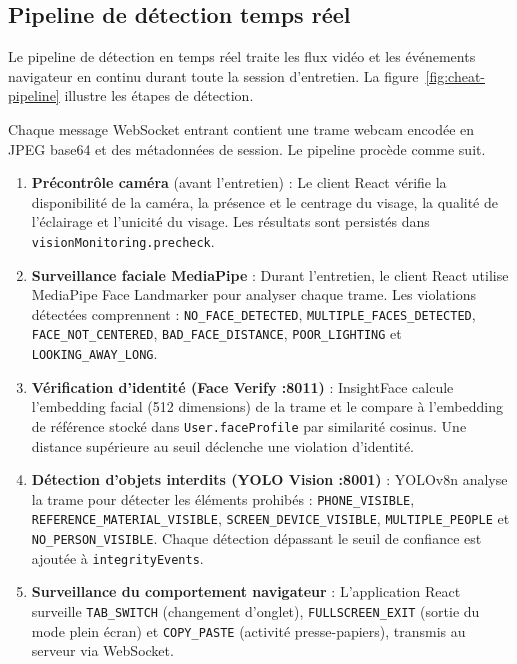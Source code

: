 \subsection{Pipeline de détection temps réel}

\begin{sloppypar}
Le pipeline de détection en temps réel traite les flux vidéo et les événements
navigateur en continu durant toute la session d'entretien.
La figure~\ref{fig:cheat-pipeline} illustre les étapes de détection.

Chaque message WebSocket entrant contient une trame webcam encodée en JPEG base64
et des métadonnées de session. Le pipeline procède comme suit.
\end{sloppypar}

\begin{enumerate}
\item \textbf{Précontrôle caméra} (avant l'entretien) : Le client React vérifie la
      disponibilité de la caméra, la présence et le centrage du visage, la qualité de
      l'éclairage et l'unicité du visage. Les résultats sont persistés dans
      \texttt{visionMonitoring.precheck}.

\item \textbf{Surveillance faciale MediaPipe} : Durant l'entretien, le client React
      utilise MediaPipe Face Landmarker pour analyser chaque trame. Les violations
      détectées comprennent : \texttt{NO\_FACE\_DETECTED}, \texttt{MULTIPLE\_FACES\_DETECTED},
      \texttt{FACE\_NOT\_CENTERED}, \texttt{BAD\_FACE\_DISTANCE}, \texttt{POOR\_LIGHTING}
      et \texttt{LOOKING\_AWAY\_LONG}.

\item \textbf{Vérification d'identité (Face Verify :8011)} : InsightFace calcule
      l'embedding facial (512 dimensions) de la trame et le compare à l'embedding de
      référence stocké dans \texttt{User.faceProfile} par similarité cosinus. Une
      distance supérieure au seuil déclenche une violation d'identité.

\item \textbf{Détection d'objets interdits (YOLO Vision :8001)} : YOLOv8n analyse la
      trame pour détecter les éléments prohibés : \texttt{PHONE\_VISIBLE},
      \texttt{REFERENCE\_MATERIAL\_VISIBLE}, \texttt{SCREEN\_DEVICE\_VISIBLE},
      \texttt{MULTIPLE\_PEOPLE} et \texttt{NO\_PERSON\_VISIBLE}. Chaque détection
      dépassant le seuil de confiance est ajoutée à \texttt{integrityEvents}.

\item \textbf{Surveillance du comportement navigateur} : L'application React surveille
      \texttt{TAB\_SWITCH} (changement d'onglet), \texttt{FULLSCREEN\_EXIT} (sortie du
      mode plein écran) et \texttt{COPY\_PASTE} (activité presse-papiers), transmis au
      serveur via WebSocket.


\end{enumerate}
